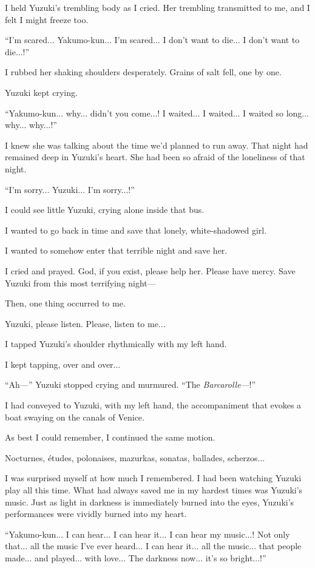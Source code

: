 \documentclass[
    a4paper,
    12pt,
    twoside,
    openany,
    UTF8,
    fontset=windows
]{ctexbook}
\begin{document}
I held Yuzuki's trembling body as I cried. Her trembling transmitted to me, and I felt I might freeze too.

``I'm scared... Yakumo-kun... I'm scared... I don't want to die... I don't want to die...!''

I rubbed her shaking shoulders desperately. Grains of salt fell, one by one.

Yuzuki kept crying.

``Yakumo-kun... why... didn't you come...! I waited... I waited... I waited so long... why... why...!''

I knew she was talking about the time we'd planned to run away. That night had remained deep in Yuzuki's heart. She had been so afraid of the loneliness of that night.

``I'm sorry... Yuzuki... I'm sorry...!''

I could see little Yuzuki, crying alone inside that bus.

I wanted to go back in time and save that lonely, white-shadowed girl.

I wanted to somehow enter that terrible night and save her.

I cried and prayed. God, if you exist, please help her. Please have mercy. Save Yuzuki from this most terrifying night---

Then, one thing occurred to me.

Yuzuki, please listen. Please, listen to me...

I tapped Yuzuki's shoulder rhythmically with my left hand.

I kept tapping, over and over...

``Ah---'' Yuzuki stopped crying and murmured. ``The \textit{Barcarolle}---!''

I had conveyed to Yuzuki, with my left hand, the accompaniment that evokes a boat swaying on the canals of Venice.

As best I could remember, I continued the same motion.

Nocturnes, études, polonaises, mazurkas, sonatas, ballades, scherzos...

I was surprised myself at how much I remembered. I had been watching Yuzuki play all this time. What had always saved me in my hardest times was Yuzuki's music. Just as light in darkness is immediately burned into the eyes, Yuzuki's performances were vividly burned into my heart.

``Yakumo-kun... I can hear... I can hear it... I can hear my music...! Not only that... all the music I've ever heard... I can hear it... all the music... that people made... and played... with love... The darkness now... it's so bright...!''
\end{document}
